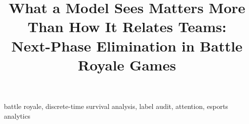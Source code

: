 \documentclass[conference]{IEEEtran}
\begin{document}

\title{What a Model Sees Matters More Than How It Relates Teams:\\Next-Phase Elimination in Battle Royale Games}

\author{}

\maketitle

\begin{abstract}

\end{abstract}

\begin{IEEEkeywords}
battle royale, discrete-time survival analysis, label audit, attention, esports analytics
\end{IEEEkeywords}












\end{document}
